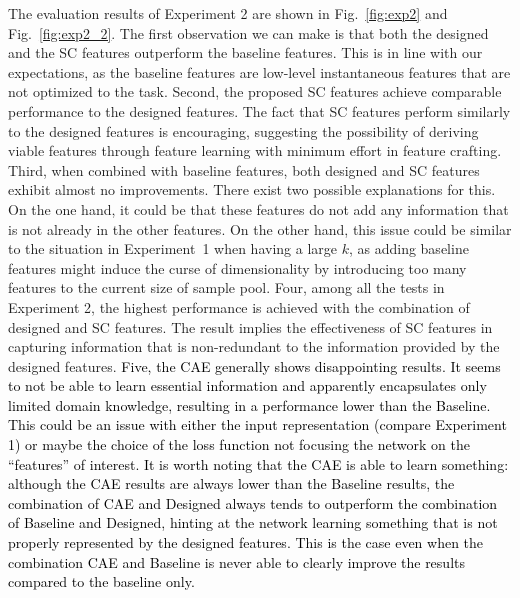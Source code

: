 \documentclass{ws-ijsc}
\newcommand{\highlight}[1]{\textcolor{black}{#1}}
\begin{document}

The evaluation results of Experiment 2 are shown in Fig.~\ref{fig:exp2} and Fig.~\ref{fig:exp2_2}. The first observation we can make is that both the designed and the SC features outperform the baseline features. This is in line with our expectations, as the baseline features are low-level instantaneous features that are not optimized to the task.  %
Second, the proposed SC features achieve comparable performance to the designed features. The fact that SC features perform similarly to the designed features is encouraging, suggesting the possibility of deriving viable features through feature learning with minimum effort in feature crafting. 
Third, when combined with baseline features, both designed and SC features exhibit almost no improvements. There exist two possible explanations for this. On the one hand, it could be that these features do not add any information that is not already in the other features. On the other hand, this issue could be similar to the situation in Experiment~1 when having a large $k$, as adding baseline features might induce the curse of dimensionality by introducing too many features to the current size of sample pool. %
Four, among all the tests in Experiment 2, the highest performance is achieved with the combination of designed and SC features. The result implies the effectiveness of SC features in capturing information that is non-redundant to the information provided by the designed features.
\highlight{Five, the CAE generally shows disappointing results. It seems to not be able to learn essential information and apparently encapsulates only limited domain knowledge, resulting in a performance lower than the Baseline. This could be an issue with either the input representation (compare Experiment 1) or maybe the choice of the loss function not focusing the network on the ``features'' of interest. It is worth noting that the CAE is able to learn something: although the CAE results are always lower than the Baseline results, the combination of CAE and Designed always tends to outperform the combination of Baseline and Designed, hinting at the network learning something that is not properly represented by the designed features. This is the case even when the combination CAE and Baseline is never able to clearly improve the results compared to the baseline only.}
\end{document}

